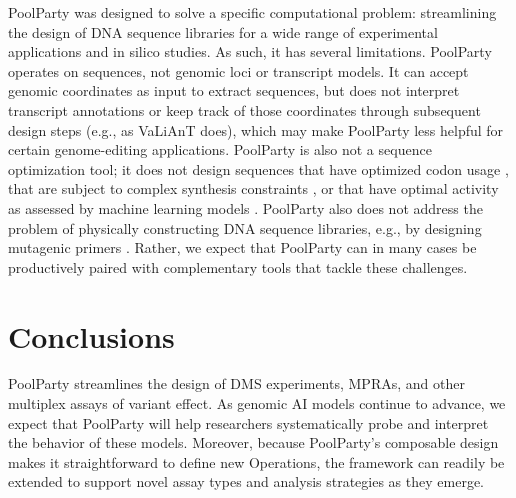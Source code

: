 \documentclass[pdflatex,sn-vancouver-num,referee,oneside]{sn-jnl}
\begin{document}
PoolParty was designed to solve a specific computational problem: streamlining the design of DNA sequence libraries for a wide range of experimental applications and in silico studies. As such, it has several limitations. PoolParty operates on sequences, not genomic loci or transcript models. It can accept genomic coordinates as input to extract sequences, but does not interpret transcript annotations or keep track of those coordinates through subsequent design steps (e.g., as VaLiAnT does), which may make PoolParty less helpful for certain genome-editing applications. PoolParty is also not a sequence optimization tool; it does not design sequences that have optimized codon usage \citep{Swainston2017rb}, that are subject to complex synthesis constraints \citep{Zulkower2020jk}, or that have optimal activity as assessed by machine learning models \citep{Schreiber2025ledidi}. PoolParty also does not address the problem of physically constructing DNA sequence libraries, e.g., by designing mutagenic primers \citep{Hiraga2021yg}. Rather, we expect that PoolParty can in many cases be productively paired with complementary tools that tackle these challenges.

\section*{Conclusions}\label{sec:conclusions}

PoolParty streamlines the design of DMS experiments, MPRAs, and other multiplex assays of variant effect. As genomic AI models continue to advance, we expect that PoolParty will help researchers systematically probe and interpret the behavior of these models. Moreover, because PoolParty's composable design makes it straightforward to define new Operations, the framework can readily be extended to support novel assay types and analysis strategies as they emerge.

\backmatter
\end{document}
